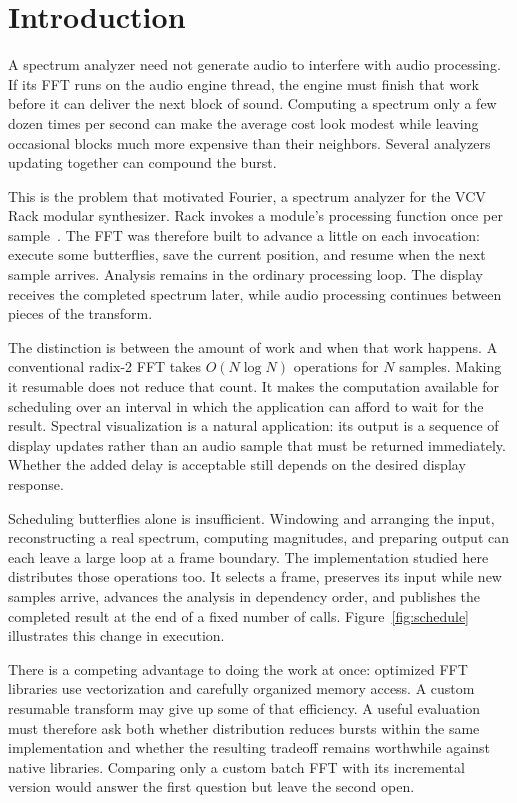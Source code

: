 \section{Introduction}
A spectrum analyzer need not generate audio to interfere with audio
processing. If its FFT runs on the audio engine thread, the engine must finish
that work before it can deliver the next block of sound. Computing a spectrum
only a few dozen times per second can make the average cost look modest while
leaving occasional blocks much more expensive than their neighbors. Several
analyzers updating together can compound the burst.

This is the problem that motivated Fourier, a spectrum analyzer for the VCV
Rack modular synthesizer. Rack invokes a module's processing function once
per sample~\cite{rack}. The FFT was therefore built to advance a little on
each invocation: execute some butterflies, save the current position, and
resume when the next sample arrives. Analysis remains in the ordinary
processing loop. The display receives the completed spectrum later, while
audio processing continues between pieces of the transform.

The distinction is between the amount of work and when that work happens.
A conventional radix-2 FFT takes $O(N\log N)$ operations for $N$ samples.
Making it resumable does not reduce that count. It makes the computation
available for scheduling over an interval in which the application can afford
to wait for the result. Spectral visualization is a natural application:
its output is a sequence of display updates rather than an audio sample that
must be returned immediately. Whether the added delay is acceptable still
depends on the desired display response.

Scheduling butterflies alone is insufficient. Windowing and arranging the
input, reconstructing a real spectrum, computing magnitudes, and preparing
output can each leave a large loop at a frame boundary. The implementation
studied here distributes those operations too. It selects a frame, preserves
its input while new samples arrive, advances the analysis in dependency order,
and publishes the completed result at the end of a fixed number of calls.
Figure~\ref{fig:schedule} illustrates this change in execution.

There is a competing advantage to doing the work at once: optimized FFT
libraries use vectorization and carefully organized memory access. A custom
resumable transform may give up some of that efficiency. A useful evaluation
must therefore ask both whether distribution reduces bursts within the same
implementation and whether the resulting tradeoff remains worthwhile against
native libraries. Comparing only a custom batch FFT with its incremental
version would answer the first question but leave the second open.

